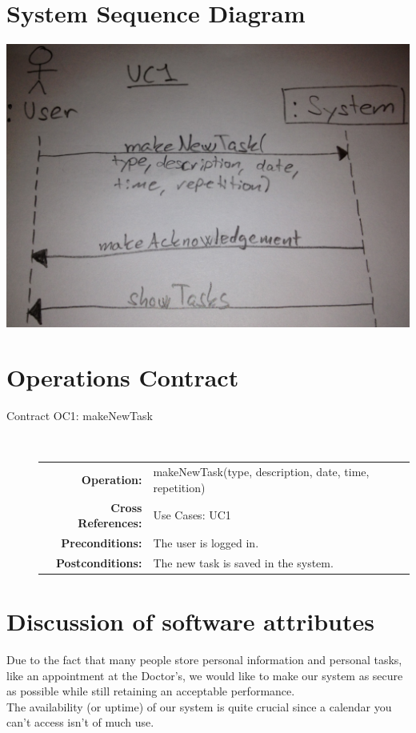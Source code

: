 \documentclass[a4paper, 10pt]{article}
\begin{document}
\section{System Sequence Diagram}
\includegraphics[width=\linewidth]{../Pictures/A38_SSD_UC1.jpg} 

\section{Operations Contract}
\begin{description}
\item[\large Contract OC1: makeNewTask] \hfill \\
\begin{tabular}{ r l }
	\textbf{Operation:} & makeNewTask(type, description, date, time, repetition) \\
	\textbf{Cross References:} & Use Cases: UC1 \\
	\textbf{Preconditions:} & The user is logged in. \\
	\textbf{Postconditions:} & The new task is saved in the system.
\end{tabular}
\end{description}

\section{Discussion of software attributes}
Due to the fact that many people store personal information and personal tasks, like an appointment at the Doctor's, we would like to make our system as secure as possible while still retaining an acceptable performance. \\
The availability (or uptime) of our system is quite crucial since a calendar you can't access isn't of much use.
\end{document}

